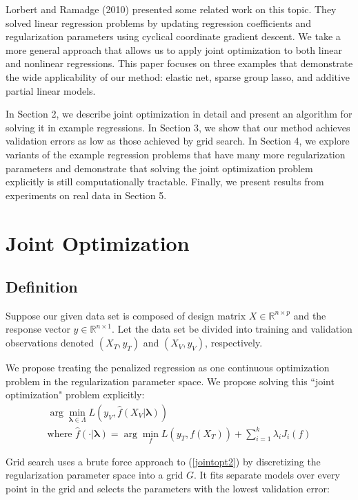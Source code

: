 \documentclass[10pt,letterpaper]{article}
\begin{document}
Lorbert and Ramadge (2010) presented some related work on this topic. They solved linear regression problems by updating regression coefficients and regularization parameters using cyclical coordinate gradient descent. We take a more general approach that allows us to apply joint optimization to both linear and nonlinear regressions. This paper focuses on three examples that demonstrate the wide applicability of our method: elastic net, sparse group lasso, and additive partial linear models.

In Section 2, we describe joint optimization in detail and present an algorithm for solving it in example regressions. In Section 3, we show that our method achieves validation errors as low as those achieved by grid search. In Section 4, we explore variants of the example regression problems that have many more regularization parameters and demonstrate that solving the joint optimization problem explicitly is still computationally tractable. Finally, we present results from experiments on real data in Section 5.

\section{Joint Optimization}
\subsection{Definition}
Suppose our given data set is composed of design matrix $X \in \mathbb{R}^{n \times p}$ and the response vector $y \in \mathbb{R}^{n \times 1}$. Let the data set be divided into training and validation observations denoted $(X_T, y_T)$ and $(X_V, y_V)$, respectively.

We propose treating the penalized regression as one continuous optimization problem in the regularization parameter space. We propose solving this ``joint optimization" problem explicitly:
\begin{equation}
\begin{array}{c}
\arg \min_{\boldsymbol{\lambda} \in \Lambda} L(y_V, \hat f (X_V | \boldsymbol{\lambda})) \\
\text{where } \hat f(\cdot | \boldsymbol{\lambda}) = \arg \min_f L(y_T, f (X_T)) + \sum\limits_{i=1}^k \lambda_i J_i(f)
\end{array}
\label{jointopt2}
\end{equation}

Grid search uses a brute force approach to (\ref{jointopt2}) by discretizing the regularization parameter space into a grid $G$. It fits separate models over every point in the grid and selects the parameters with the lowest validation error:
\end{document}
